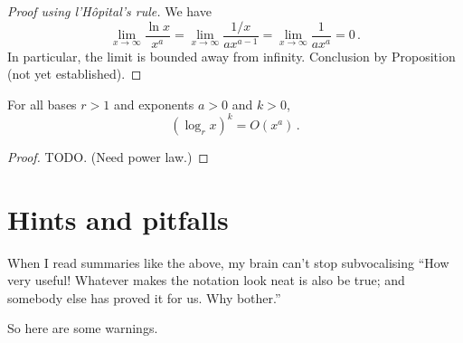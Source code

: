 \documentclass{tstextbook}
\begin{document}
\begin{proof}[Proof using l’Hôpital’s rule]
We have
\[ 
\lim_{x\rightarrow \infty} \frac{\ln x}{ x^a} = 
 \lim_{x\rightarrow \infty} \frac{1/x}{a x^{a-1}} = 
 \lim_{x\rightarrow \infty} \frac{1}{a x^a} = 0 \,.
\]
In particular, the limit is bounded away from infinity.
  Conclusion by Proposition (not yet established).
\end{proof}

\begin{theorem}
  For all  bases \(r> 1\) and exponents \(a>0\) and \(k> 0\), \[ (\log_r x)^k = O(x^a)\,.\]
\end{theorem}

\begin{proof}
  TODO. (Need power law.)
\end{proof}

\section{Hints and pitfalls}

When I read summaries like the above, my brain can't stop subvocalising ``How very useful! Whatever makes the notation look neat is also be true; and somebody else has proved it for us. Why bother.''

So here are some warnings.
\end{document}
